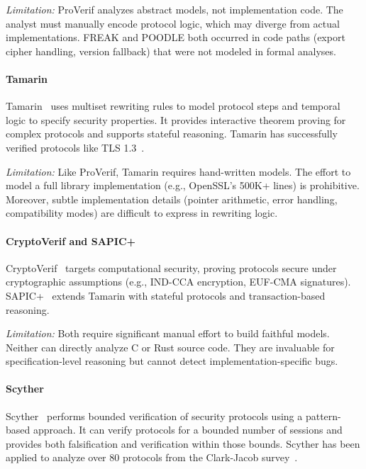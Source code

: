 \documentclass[10pt,twocolumn]{article}
\begin{document}
\emph{Limitation:} ProVerif analyzes abstract models, not implementation code. The analyst must manually encode protocol logic, which may diverge from actual implementations. FREAK and POODLE both occurred in code paths (export cipher handling, version fallback) that were not modeled in formal analyses.

\paragraph{Tamarin}
Tamarin~\cite{meier2013tamarin} uses multiset rewriting rules to model protocol steps and temporal logic to specify security properties. It provides interactive theorem proving for complex protocols and supports stateful reasoning. Tamarin has successfully verified protocols like TLS 1.3~\cite{cremers2017comprehensive}.

\emph{Limitation:} Like ProVerif, Tamarin requires hand-written models. The effort to model a full library implementation (e.g., OpenSSL's 500K+ lines) is prohibitive. Moreover, subtle implementation details (pointer arithmetic, error handling, compatibility modes) are difficult to express in rewriting logic.

\paragraph{CryptoVerif and SAPIC+}
CryptoVerif~\cite{blanchet2006cryptoverif} targets computational security, proving protocols secure under cryptographic assumptions (e.g., IND-CCA encryption, EUF-CMA signatures). SAPIC+~\cite{kremer2014sapic} extends Tamarin with stateful protocols and transaction-based reasoning.

\emph{Limitation:} Both require significant manual effort to build faithful models. Neither can directly analyze C or Rust source code. They are invaluable for specification-level reasoning but cannot detect implementation-specific bugs.

\paragraph{Scyther}
Scyther~\cite{cremers2008scyther} performs bounded verification of security protocols using a pattern-based approach. It can verify protocols for a bounded number of sessions and provides both falsification and verification within those bounds. Scyther has been applied to analyze over 80 protocols from the Clark-Jacob survey~\cite{cremers2006scyther}.
\end{document}
